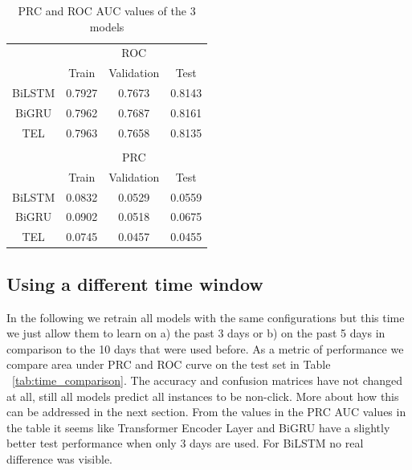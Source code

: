 \documentclass[utf8x]{ctexart}
\begin{document}
\begin{table}[ht]
  \centering
  \caption{PRC and ROC AUC values of the 3 models}
  \label{tab:rocprc}
  \begin{tabular}{c|ccc}

           & \multicolumn{3}{c}{ROC}                       \\
           & Train                   & Validation & Test   \\
    \hline
    BiLSTM & 0.7927                  & 0.7673     & 0.8143 \\
    BiGRU  & 0.7962                  & 0.7687     & 0.8161 \\
    TEL    & 0.7963                  & 0.7658     & 0.8135 \\
    \hline
           &                         &            &        \\
           & \multicolumn{3}{c}{PRC}                       \\
           & Train                   & Validation & Test   \\
    \hline
    BiLSTM & 0.0832                  & 0.0529     & 0.0559 \\
    BiGRU  & 0.0902                  & 0.0518     & 0.0675 \\
    TEL    & 0.0745                  & 0.0457     & 0.0455 \\
  \end{tabular}
\end{table}

\subsection{Using a different time window}

In the following we retrain all models with the same configurations but this time we just allow them to learn on a) the past 3 days or b) on the past 5 days in comparison to the 10 days that were used before. As a metric of performance we compare  area under PRC and ROC curve on the test set in Table ~\ref{tab:time_comparison}. The accuracy and confusion matrices have not changed at all, still all models predict all instances to be non-click. More about how this can be addressed in the next section.
From the values in the PRC AUC values in the table it seems like Transformer Encoder Layer and BiGRU have a slightly better test performance when only 3 days are used. For BiLSTM no real difference was visible.
\end{document}
